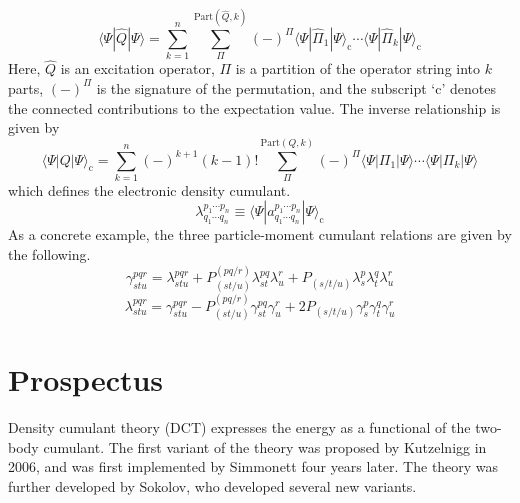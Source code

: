 \begin{equation}
    \langle\Psi|\hat{Q}|\Psi\rangle
    =
    \sum_{k=1}^n
    \sum_{\Pi}^{\mathrm{Part}(\hat{Q}, k)}
    (-)^{\Pi}
    \langle\Psi|\hat{\Pi}_1|\Psi\rangle_\mathrm{c}
    \cdots
    \langle\Psi|\hat{\Pi}_k|\Psi\rangle_\mathrm{c}
\end{equation}
Here, \(\hat{Q}\) is an excitation operator, \(\Pi\) is a partition of the
operator string into \(k\) parts, \((-)^\Pi\) is the signature of the
permutation, and the subscript `\(\mathrm{c}\)' denotes the connected
contributions to the expectation value.
The inverse relationship is given by
\begin{equation}
    \langle\Psi|Q|\Psi\rangle_\mathrm{c}
    =
    \sum_{k=1}^n
    (-)^{k+1}
    (k-1)!
    \sum_{\Pi}^{\mathrm{Part}(Q, k)}
    (-)^{\Pi}
    \langle\Psi|\Pi_1|\Psi\rangle
    \cdots
    \langle\Psi|\Pi_k|\Psi\rangle
\end{equation}
which defines the electronic density cumulant.
\begin{equation}
    \lambda^{p_1\cdots p_n}_{q_1\cdots q_n}
    \equiv
    \langle\Psi|a^{p_1\cdots p_n}_{q_1\cdots q_n}|\Psi\rangle_\mathrm{c}
\end{equation}
As a concrete example, the three particle-moment cumulant relations are given by
the following.
\begin{equation}
    \gamma^{pqr}_{stu}
    =
    \lambda^{pqr}_{stu}
    +
    P^{(pq/r)}_{(st/u)}
    \lambda^{pq}_{st}
    \lambda^r_u
    +
    P_{(s/t/u)}
    \lambda^p_s
    \lambda^q_t
    \lambda^r_u
\end{equation}
\begin{equation}
    \lambda^{pqr}_{stu}
    =
    \gamma^{pqr}_{stu}
    -
    P^{(pq/r)}_{(st/u)}
    \gamma^{pq}_{st}
    \gamma^r_u
    +
    2
    P_{(s/t/u)}
    \gamma^p_s
    \gamma^q_t
    \gamma^r_u
\end{equation}


\section{Prospectus}

Density cumulant theory (DCT) expresses the energy as a functional of the
two-body cumulant.
The first variant of the theory was proposed by Kutzelnigg in
2006,\cite{Kutzelnigg:2006p171101} and was first implemented by Simmonett four
years later.\cite{Simmonett:2010p174122}
The theory was further developed by Sokolov, who developed several new
variants.\cite{Sokolov:2013p024107,Sokolov:2013p204110,Sokolov:2014p074111}

